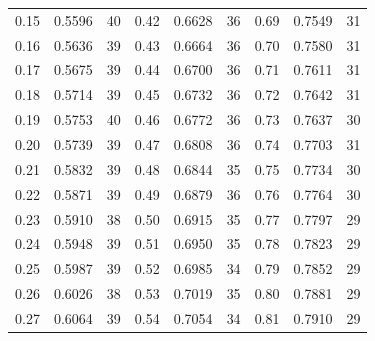 \documentclass[russian, 12pt, fleqn,x11names]{article}
\begin{document}
\begin{center}
\begin{tabular}[b]{ | l | l |  l || l | l | l || l | l | l |   }
0.15&0.5596&40      &0.42&0.6628&36	 &  0.69&0.7549&31\\%
0.16&0.5636&39	 &0.43&0.6664&36  &  0.70&0.7580&31\\%
0.17&0.5675&39	 &0.44&0.6700&36	 &  0.71&0.7611&31\\%
0.18&0.5714&39      &0.45&0.6732&36	 &  0.72&0.7642&31\\%
0.19&0.5753&40      &0.46&0.6772&36	 &  0.73&0.7637&30\\%
0.20&0.5739&39	 &0.47&0.6808&36	 &  0.74&0.7703&31\\%
0.21&0.5832&39      &0.48&0.6844&35	 &  0.75&0.7734&30\\%
0.22&0.5871&39	 &0.49&0.6879&36  &  0.76&0.7764&30\\%
0.23&0.5910&38      &0.50&0.6915&35	 &  0.77&0.7797&29\\%
0.24&0.5948&39      &0.51&0.6950&35	 &  0.78&0.7823&29\\%
0.25&0.5987&39      &0.52&0.6985&34	 &  0.79&0.7852&29\\%
0.26&0.6026&38 	 &0.53&0.7019&35  & 0.80&0.7881&29\\	
0.27&0.6064&39      &0.54&0.7054&34  &  0.81&0.7910&29 \\
\hline
\end{tabular}
\end{center}
\end{document}

